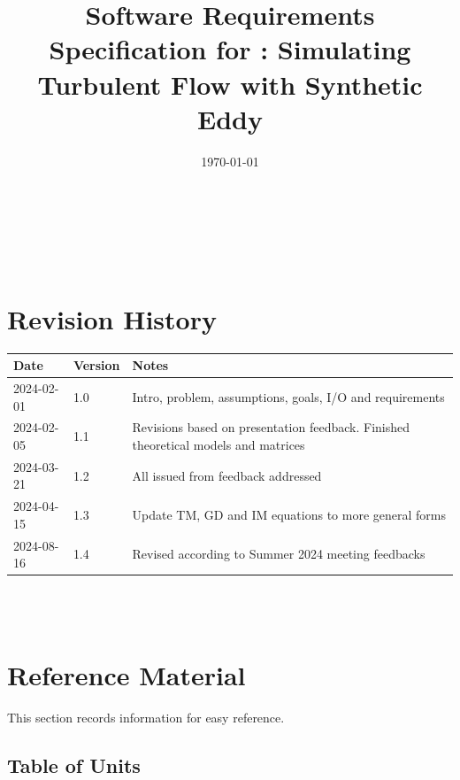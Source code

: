 \documentclass[12pt]{article}
\begin{document}
\title{Software Requirements Specification for \progname: Simulating Turbulent Flow with Synthetic Eddy}
\author{\authname}
\date{\today}
	
\maketitle

~\newpage


\tableofcontents

~\newpage

\section*{Revision History}

\begin{tabularx}{\textwidth}{p{3cm}p{2cm}X}
\toprule {\bf Date} & {\bf Version} & {\bf Notes}\\
\midrule
2024-02-01 & 1.0 & Intro, problem, assumptions, goals, I/O and requirements\\
2024-02-05 & 1.1 & Revisions based on presentation feedback. Finished theoretical models and matrices\\
2024-03-21 & 1.2 & All issued from feedback addressed\\
2024-04-15 & 1.3 & Update TM, GD and IM equations to more general forms\\
2024-08-16 & 1.4 & Revised according to Summer 2024 meeting feedbacks\\
\bottomrule
\end{tabularx}

~\\

~\newpage

\section{Reference Material}

This section records information for easy reference.

\subsection{Table of Units}
\end{document}
